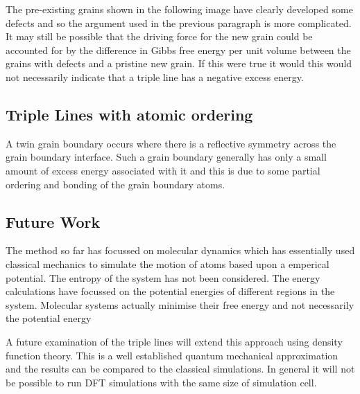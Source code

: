 \documentclass[12pt,a4paper]{book}
\begin{document}
The pre-existing grains shown in the following image have clearly developed some defects and so the argument used in the previous paragraph is more complicated. It may still be possible that the driving force for the new grain could be accounted for by the difference in Gibbs free energy per unit volume between the grains with defects and a pristine new grain. If this were true it would this would not necessarily indicate that a triple line has a negative excess energy.


\subsection{Triple Lines with atomic ordering}

A twin grain boundary occurs where there is a reflective symmetry across the grain boundary interface. Such a grain boundary generally has only a small amount of excess energy associated with it and this is due to some partial ordering and bonding of the grain boundary atoms.

\subsection{Future Work}

The method so far has focussed on molecular dynamics which has essentially used classical mechanics to simulate the motion of atoms based upon a emperical potential. The entropy of the system has not been considered. The energy calculations have focussed on the potential energies of different regions in the system. Molecular systems actually minimise their free energy and not necessarily the potential energy 

A future examination of the triple lines will extend this approach using density function theory. This is a well established quantum mechanical approximation and the results can be compared to the classical simulations. In general it will not be possible to run DFT simulations with the same size of simulation cell.  
 
\end{document}
